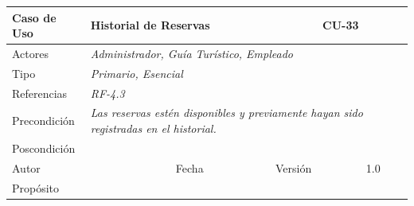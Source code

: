 \begin{table}[H]
    \begin{tabular}{|llllllll|}
    \hline
    \multicolumn{1}{|l|}{Caso de Uso}        & \multicolumn{5}{l|}{Historial de Reservas}                                                                                     & \multicolumn{2}{l|}{\cellcolor[HTML]{E6E6E6}CU-33}            \\ \hline
    \multicolumn{1}{|l|}{Actores}            & \multicolumn{7}{l|}{{\color[HTML]{808080} \textit{Administrador, Guía Turístico, Empleado}}}                                                                                                   \\ \hline
    \multicolumn{1}{|l|}{Tipo}               & \multicolumn{7}{l|}{{\color[HTML]{808080} \textit{Primario, Esencial}}}                                                                                                                        \\ \hline
    \multicolumn{1}{|l|}{Referencias}        & \multicolumn{2}{l|}{{\color[HTML]{808080} \textit{RF-4.3}}}                & \multicolumn{5}{l|}{}                                                                                             \\ \hline
    \multicolumn{1}{|l|}{Precondición}       & \multicolumn{7}{p{12cm}|}{{\color[HTML]{808080} \textit{Las reservas estén disponibles y previamente hayan sido registradas en el historial.}}}                                                      \\ \hline
    \multicolumn{1}{|l|}{Poscondición}       & \multicolumn{7}{l|}{}                                                                                                                                                                          \\ \hline
    \multicolumn{1}{|l|}{Autor}              & \multicolumn{1}{l|}{}                         & \multicolumn{2}{l|}{Fecha}             & \multicolumn{1}{l|}{}       & \multicolumn{2}{l|}{Versión}           & 1.0                            \\ \hline
    \multicolumn{8}{|l|}{\cellcolor[HTML]{F2F2F2}Propósito}                                                                                                                                                                                   \\ \hline

\end{tabular}
\end{table}
